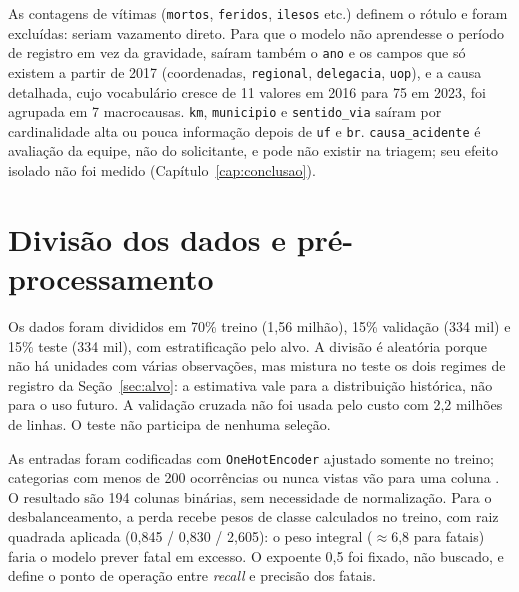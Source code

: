 As contagens de vítimas (\texttt{mortos}, \texttt{feridos}, \texttt{ilesos} etc.) definem o rótulo e foram excluídas: seriam vazamento direto. Para que o modelo não aprendesse o período de registro em vez da gravidade, saíram também o \texttt{ano} e os campos que só existem a partir de 2017 (coordenadas, \texttt{regional}, \texttt{delegacia}, \texttt{uop}), e a causa detalhada, cujo vocabulário cresce de 11 valores em 2016 para 75 em 2023, foi agrupada em 7 macrocausas. \texttt{km}, \texttt{municipio} e \texttt{sentido\_via} saíram por cardinalidade alta ou pouca informação depois de \texttt{uf} e \texttt{br}. \texttt{causa\_acidente} é avaliação da equipe, não do solicitante, e pode não existir na triagem; seu efeito isolado não foi medido (Capítulo~\ref{cap:conclusao}).

\section{Divisão dos dados e pré-processamento}
\label{sec:preproc}

Os dados foram divididos em 70\% treino (1,56 milhão), 15\% validação (334 mil) e 15\% teste (334 mil), com estratificação pelo alvo. A divisão é aleatória porque não há unidades com várias observações, mas mistura no teste os dois regimes de registro da Seção~\ref{sec:alvo}: a estimativa vale para a distribuição histórica, não para o uso futuro. A validação cruzada não foi usada pelo custo com 2,2 milhões de linhas. O teste não participa de nenhuma seleção.

As entradas foram codificadas com \texttt{OneHotEncoder} ajustado somente no treino; categorias com menos de 200 ocorrências ou nunca vistas vão para uma coluna . O resultado são 194 colunas binárias, sem necessidade de normalização. Para o desbalanceamento, a perda recebe pesos de classe calculados no treino, com raiz quadrada aplicada (0,845 / 0,830 / 2,605): o peso integral ($\approx$6,8 para fatais) faria o modelo prever fatal em excesso. O expoente 0,5 foi fixado, não buscado, e define o ponto de operação entre \textit{recall} e precisão dos fatais.
